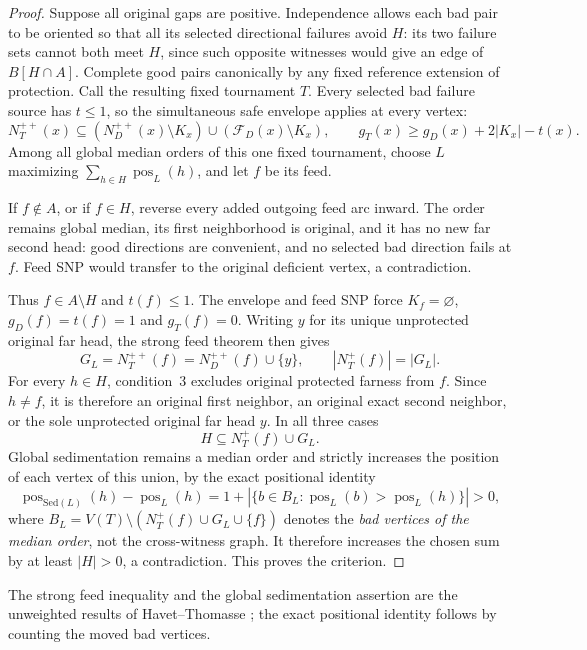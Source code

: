 \begin{proof}
Suppose all original gaps are positive. Independence allows each bad
pair to be oriented so that all its selected directional failures
avoid $H$: its two failure sets cannot both meet $H$, since such
opposite witnesses would give an edge of $B[H\cap A]$. Complete good
pairs canonically by any fixed reference extension of protection.
Call the resulting fixed tournament $T$. Every selected bad failure
source has $t\le1$, so the simultaneous safe envelope applies at
every vertex:
\[
 N_T^{++}(x)\subseteq
 (N_D^{++}(x)\setminus K_x)\cup
 (\mathcal F_D(x)\setminus K_x),\qquad
 g_T(x)\ge g_D(x)+2|K_x|-t(x).
\]
Among all global median orders of this one fixed tournament, choose
$L$ maximizing $\sum_{h\in H}\operatorname{pos}_L(h)$, and let $f$
be its feed.

If $f\notin A$, or if $f\in H$, reverse every added outgoing feed
arc inward. The order remains global median, its first neighborhood
is original, and it has no new far second head: good directions are
convenient, and no selected bad direction fails at $f$. Feed SNP
would transfer to the original deficient vertex, a contradiction.

Thus $f\in A\setminus H$ and $t(f)\le1$. The envelope and feed SNP
force $K_f=\varnothing$, $g_D(f)=t(f)=1$ and $g_T(f)=0$.
Writing $y$ for its unique unprotected original far head, the strong
feed theorem then gives
\[
 G_L=N_T^{++}(f)=N_D^{++}(f)\cup\{y\},\qquad
 |N_T^+(f)|=|G_L|.
\]
For every $h\in H$, condition~3 excludes original protected farness
from $f$. Since $h\ne f$, it is therefore an original first neighbor,
an original exact second neighbor, or the sole unprotected original
far head $y$. In all three cases
\[
 H\subseteq N_T^+(f)\cup G_L.
\]
Global sedimentation remains a median order and strictly increases
the position of each vertex of this union, by the exact positional
identity
\[
 \operatorname{pos}_{\mathrm{Sed}(L)}(h)-\operatorname{pos}_L(h)
 =1+|\{b\in B_L:\operatorname{pos}_L(b)>
                         \operatorname{pos}_L(h)\}|>0,
\]
where $B_L=V(T)\setminus(N_T^+(f)\cup G_L\cup\{f\})$ denotes the
\emph{bad vertices of the median order}, not the cross-witness graph.
It therefore increases the chosen sum by at least $|H|>0$, a
contradiction. This proves the criterion.
\end{proof}

The strong feed inequality and the global sedimentation assertion are
the unweighted results of Havet--Thomasse
\cite[Theorem~1 and Lemma~1]{HavetThomasse2000}; the exact positional
identity follows by counting the moved bad vertices.

